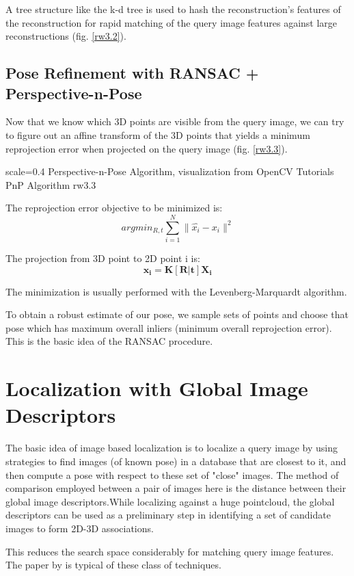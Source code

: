 A tree structure like the k-d tree is used to hash the reconstruction's features of the reconstruction for rapid matching of the query image features against large reconstructions (fig. \ref{rw3.2}).

\subsection{Pose Refinement with RANSAC + Perspective-n-Pose}
Now that we know which 3D points are visible from the query image, we can try to figure out an affine transform of the 3D points that yields a minimum reprojection error when projected on the query image (fig. \ref{rw3.3}). 

{scale=0.4}%
{Perspective-n-Pose Algorithm, visualization from OpenCV Tutorials}%
{PnP Algorithm}%
{rw3.3} %

The reprojection error objective to be minimized is:
\[argmin_{R, t}\sum_{i=1}^{N}\|\hat{x_i} - x_i\|^2\]

The projection from 3D point to 2D point i is:
\[\mathbf{x_i} = \mathbf{K[R|t]X_i}\]

The minimization is usually performed with the Levenberg-Marquardt algorithm. 

To obtain a robust estimate of our pose, we sample sets of points and choose that pose which has maximum overall inliers (minimum overall reprojection error). This is the basic idea of the RANSAC procedure.

\section{Localization with Global Image Descriptors}
The basic idea of image based localization is to localize a query image by using strategies to find images (of known pose) in a database that are closest to it, and then compute a pose with respect to these set of "close" images. The method of comparison employed between a pair of images here is the distance between their global image descriptors.While localizing against a huge pointcloud, the global descriptors can be used as a preliminary step in identifying a set of candidate images to form 2D-3D associations. 

This reduces the search space considerably for matching query image features. The paper by \cite{Sattler2012} is typical of these class of techniques.

